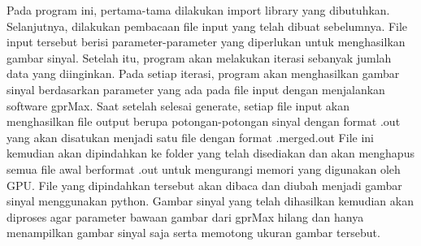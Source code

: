 Pada program ini, pertama-tama dilakukan import library yang dibutuhkan. Selanjutnya, dilakukan pembacaan file input yang telah dibuat sebelumnya. File input tersebut berisi parameter-parameter yang diperlukan untuk menghasilkan gambar sinyal. Setelah itu, program akan melakukan iterasi sebanyak jumlah data yang diinginkan. Pada setiap iterasi, program akan menghasilkan gambar sinyal berdasarkan parameter yang ada pada file input dengan menjalankan software gprMax. Saat setelah selesai generate, setiap file input akan menghasilkan file output berupa potongan-potongan sinyal dengan format .out yang akan disatukan menjadi satu file dengan format .merged.out File ini kemudian akan dipindahkan ke folder yang telah disediakan dan akan menghapus semua file awal berformat .out untuk mengurangi memori yang digunakan oleh GPU. File yang dipindahkan tersebut akan dibaca dan diubah menjadi gambar sinyal menggunakan python. Gambar sinyal yang telah dihasilkan kemudian akan diproses agar parameter bawaan gambar dari gprMax hilang dan hanya menampilkan gambar sinyal saja serta memotong ukuran gambar tersebut.

